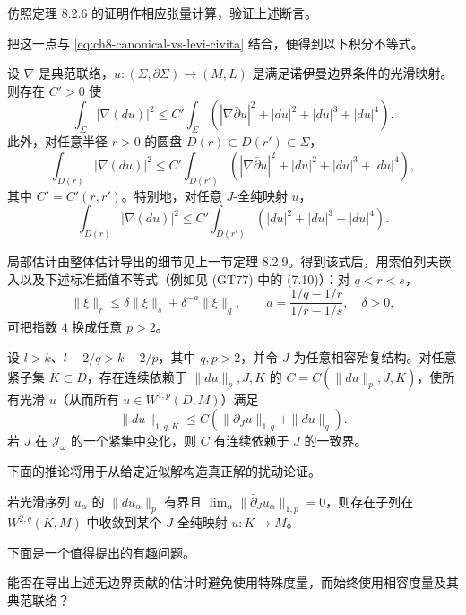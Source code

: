 \begin{exercise}\label{ex:ch8-verify-no-boundary-contribution}
仿照定理 8.2.6 的证明作相应张量计算，验证上述断言。
\end{exercise}

把这一点与 \eqref{eq:ch8-canonical-vs-levi-civita} 结合，便得到以下积分不等式。
\begin{proposition}\label{prop:ch8-integral-estimate-no-boundary}
设 $\nabla$ 是典范联络，$u:(\Sigma,\partial\Sigma)\to(M,L)$ 是满足诺伊曼边界条件的光滑映射。则存在 $C'>0$ 使
\[
 \int_\Sigma|\nabla(du)|^2\leq C'\int_\Sigma
 (|\nabla\bar\partial u|^2+|du|^2+|du|^3+|du|^4).
\]
此外，对任意半径 $r>0$ 的圆盘 $D(r)\subset D(r')\subset\Sigma$，
\[
 \int_{D(r)}|\nabla(du)|^2\leq C'\int_{D(r')}
 (|\nabla\bar\partial u|^2+|du|^2+|du|^3+|du|^4),
\]
其中 $C'=C'(r,r')$。特别地，对任意 $J$-全纯映射 $u$，
\begin{equation}
 \int_{D(r)}|\nabla(du)|^2\leq C'\int_{D(r')}
 (|du|^2+|du|^3+|du|^4).
 \label{eq:ch8-local-no-boundary-estimate}
\end{equation}
\end{proposition}

局部估计由整体估计导出的细节见上一节定理 8.2.9。得到该式后，用索伯列夫嵌入以及下述标准插值不等式（例如见 (GT77) 中的 (7.10)）：对 $q<r<s$，
\[
 \|\xi\|_r\leq\delta\|\xi\|_s+\delta^{-a}\|\xi\|_q,\qquad
 a=\frac{1/q-1/r}{1/r-1/s},\quad\delta>0,
\]
可把指数 $4$ 换成任意 $p>2$。

\begin{theorem}[主要离壳椭圆估计]\label{thm:ch8-main-off-shell-elliptic-estimate}
设 $l>k$、$l-2/q>k-2/p$，其中 $q,p>2$，并令 $J$ 为任意相容殆复结构。对任意紧子集 $K\subset D$，存在连续依赖于 $\|du\|_p,J,K$ 的
$C=C(\|du\|_p,J,K)$，使所有光滑 $u$（从而所有 $u\in W^{1,p}(D,M)$）满足
\begin{equation}
 \|du\|_{1,q,K}\leq C(\|\bar\partial_Ju\|_{1,q}+\|du\|_q).
 \label{eq:ch8-main-off-shell-local}
\end{equation}
若 $J$ 在 $\mathcal J_\omega$ 的一个紧集中变化，则 $C$ 有连续依赖于 $J$ 的一致界。
\end{theorem}

下面的推论将用于从给定近似解构造真正解的扰动论证。

\begin{corollary}\label{cor:ch8-approximate-solutions-subsequence}
若光滑序列 $u_\alpha$ 的 $\|du_\alpha\|_p$ 有界且
$\lim_\alpha\|\bar\partial_Ju_\alpha\|_{1,p}=0$，则存在子列在
$W^{2,q}(K,M)$ 中收敛到某个 $J$-全纯映射 $u:K\to M$。
\end{corollary}

下面是一个值得提出的有趣问题。
\begin{question}\label{ques:ch8-avoid-special-metric}
能否在导出上述无边界贡献的估计时避免使用特殊度量，而始终使用相容度量及其典范联络？
\end{question}
